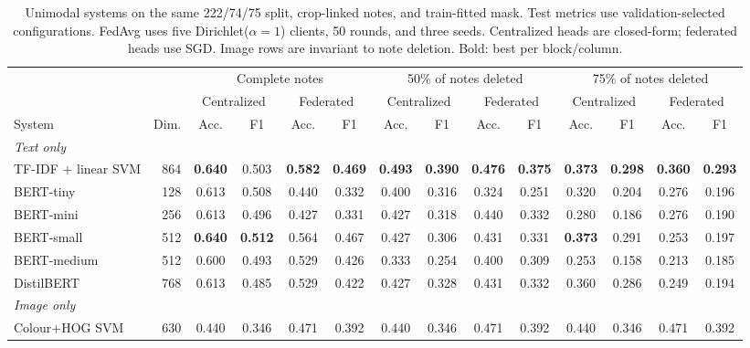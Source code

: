 \documentclass[conference]{IEEEtran}
\begin{document}
\begin{table}[t]
\caption{Unimodal systems on the same 222/74/75 split, crop-linked notes, and train-fitted mask. Test metrics use validation-selected configurations. FedAvg uses five Dirichlet($\alpha=1$) clients, 50 rounds, and three seeds. Centralized heads are closed-form; federated heads use SGD. Image rows are invariant to note deletion. Bold: best per block/column.}
\label{tab:unimodal_cent_fed}
\centering\footnotesize
\setlength\tabcolsep{4pt}
\begin{tabular}{lrcccccccccccc}
\toprule
 &  & \multicolumn{4}{c}{Complete notes} & \multicolumn{4}{c}{50\% of notes deleted} & \multicolumn{4}{c}{75\% of notes deleted}\\
\cmidrule(lr){3-6}\cmidrule(lr){7-10}\cmidrule(lr){11-14}
 &  & \multicolumn{2}{c}{Centralized} & \multicolumn{2}{c}{Federated} & \multicolumn{2}{c}{Centralized} & \multicolumn{2}{c}{Federated} & \multicolumn{2}{c}{Centralized} & \multicolumn{2}{c}{Federated}\\
\cmidrule(lr){3-4}\cmidrule(lr){5-6}\cmidrule(lr){7-8}\cmidrule(lr){9-10}\cmidrule(lr){11-12}\cmidrule(lr){13-14}
System & Dim. & Acc. & F1 & Acc. & F1 & Acc. & F1 & Acc. & F1 & Acc. & F1 & Acc. & F1\\
\midrule
\multicolumn{14}{l}{\emph{Text only}}\\
TF-IDF $+$ linear SVM & 864 & \textbf{0.640} & 0.503 & \textbf{0.582} & \textbf{0.469} & \textbf{0.493} & \textbf{0.390} & \textbf{0.476} & \textbf{0.375} & \textbf{0.373} & \textbf{0.298} & \textbf{0.360} & \textbf{0.293}\\
BERT-tiny & 128 & 0.613 & 0.508 & 0.440 & 0.332 & 0.400 & 0.316 & 0.324 & 0.251 & 0.320 & 0.204 & 0.276 & 0.196\\
BERT-mini & 256 & 0.613 & 0.496 & 0.427 & 0.331 & 0.427 & 0.318 & 0.440 & 0.332 & 0.280 & 0.186 & 0.276 & 0.190\\
BERT-small & 512 & \textbf{0.640} & \textbf{0.512} & 0.564 & 0.467 & 0.427 & 0.306 & 0.431 & 0.331 & \textbf{0.373} & 0.291 & 0.253 & 0.197\\
BERT-medium & 512 & 0.600 & 0.493 & 0.529 & 0.426 & 0.333 & 0.254 & 0.400 & 0.309 & 0.253 & 0.158 & 0.213 & 0.185\\
DistilBERT & 768 & 0.613 & 0.485 & 0.529 & 0.422 & 0.427 & 0.328 & 0.431 & 0.332 & 0.360 & 0.286 & 0.249 & 0.194\\
\midrule
\multicolumn{14}{l}{\emph{Image only}}\\
Colour$+$HOG SVM & 630 & 0.440 & 0.346 & 0.471 & 0.392 & 0.440 & 0.346 & 0.471 & 0.392 & 0.440 & 0.346 & 0.471 & 0.392\\

\end{tabular}
\end{table}
\end{document}
